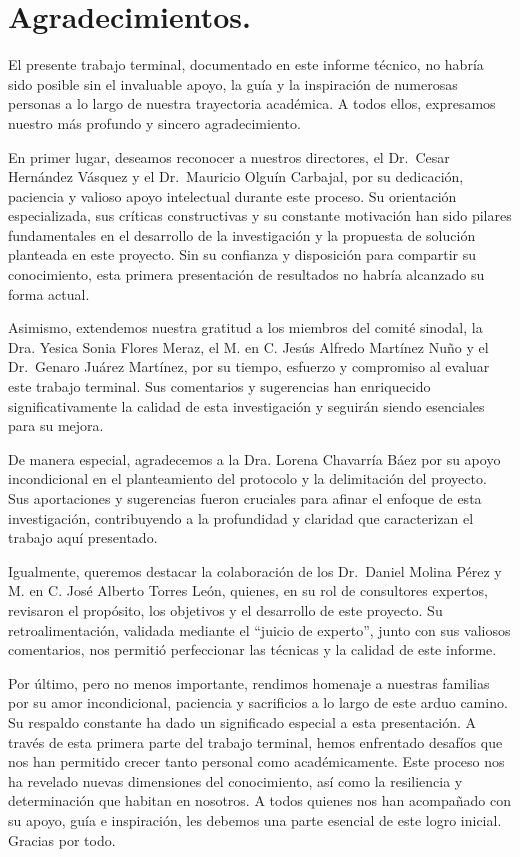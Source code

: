 \chapter{Agradecimientos.}
El presente trabajo terminal, documentado en este informe técnico, no habría sido posible sin el invaluable apoyo, la guía y la inspiración de numerosas personas a lo largo de nuestra trayectoria académica. A todos ellos, expresamos nuestro más profundo y sincero agradecimiento.

En primer lugar, deseamos reconocer a nuestros directores, el Dr.\ Cesar Hernández Vásquez y el Dr.\ Mauricio Olguín Carbajal, por su dedicación, paciencia y valioso apoyo intelectual durante este proceso. Su orientación especializada, sus críticas constructivas y su constante motivación han sido pilares fundamentales en el desarrollo de la investigación y la propuesta de solución planteada en este proyecto. Sin su confianza y disposición para compartir su conocimiento, esta primera presentación de resultados no habría alcanzado su forma actual.

Asimismo, extendemos nuestra gratitud a los miembros del comité sinodal, la Dra. Yesica Sonia Flores Meraz, el M. en C. Jesús Alfredo Martínez Nuño y el Dr.\ Genaro Juárez Martínez, por su tiempo, esfuerzo y compromiso al evaluar este trabajo terminal. Sus comentarios y sugerencias han enriquecido significativamente la calidad de esta investigación y seguirán siendo esenciales para su mejora.

De manera especial, agradecemos a la Dra. Lorena Chavarría Báez por su apoyo incondicional en el planteamiento del protocolo y la delimitación del proyecto. Sus aportaciones y sugerencias fueron cruciales para afinar el enfoque de esta investigación, contribuyendo a la profundidad y claridad que caracterizan el trabajo aquí presentado.

Igualmente, queremos destacar la colaboración de los Dr.\ Daniel Molina Pérez y M. en C. José Alberto Torres León, quienes, en su rol de consultores expertos, revisaron el propósito, los objetivos y el desarrollo de este proyecto. Su retroalimentación, validada mediante el “juicio de experto”, junto con sus valiosos comentarios, nos permitió perfeccionar las técnicas y la calidad de este informe.

Por último, pero no menos importante, rendimos homenaje a nuestras familias por su amor incondicional, paciencia y sacrificios a lo largo de este arduo camino. Su respaldo constante ha dado un significado especial a esta presentación.
A través de esta primera parte del trabajo terminal, hemos enfrentado desafíos que nos han permitido crecer tanto personal como académicamente. Este proceso nos ha revelado nuevas dimensiones del conocimiento, así como la resiliencia y determinación que habitan en nosotros. A todos quienes nos han acompañado con su apoyo, guía e inspiración, les debemos una parte esencial de este logro inicial. Gracias por todo.
